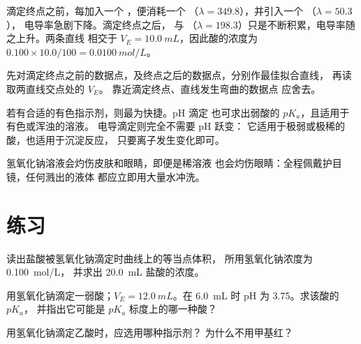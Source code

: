\begin{example}[读取两条直线]\label{ex:g12:ph-conductivity-titrations:lines}
滴定终点之前，每加入一个 ，便消耗一个 
（$\lambda = 349.8$），并引入一个 （$\lambda = 50.3$），
电导率急剧下降。滴定终点之后， 与 
（$\lambda = 198.3$）只是不断积累，电导率随之上升。两条直线
相交于 $V_E = \qty{10.0}{mL}$，因此酸的浓度为
$0.100 \times 10.0 / 100 = \qty{0.0100}{mol/L}$。
\end{example}

\begin{method}[由电导滴定确定滴定终点]\label{met:g12:ph-conductivity-titrations:two-lines}
先对滴定终点之前的数据点，及终点之后的数据点，分别作最佳拟合直线，
再读取两直线交点处的 $V_E$。
靠近滴定终点、直线发生弯曲的数据点
应舍去。
\end{method}

\begin{remark}[何时选用何种方法]\label{rem:g12:ph-conductivity-titrations:which}
若有合适的有色指示剂，则最为快捷。pH 滴定
也可求出弱酸的 $pK_a$，且适用于有色或浑浊的溶液。
电导滴定则完全不需要 pH 跃变：
它适用于极弱或极稀的酸，也适用于沉淀反应，
只要离子发生变化即可。
\end{remark}

\begin{safety}{}
氢氧化钠溶液会灼伤皮肤和眼睛，即便是稀溶液
  也会灼伤眼睛：全程佩戴护目镜，任何溅出的液体
都应立即用大量水冲洗。
\end{safety}

\section{练习}


\begin{exercise}[$\star$]\label{exo:g12:ph-conductivity-titrations:1}
读出盐酸被氢氧化钠滴定时曲线上的等当点体积，
所用氢氧化钠浓度为 \qty{0.100}{mol/L}，
并求出 \qty{20.0}{mL} 盐酸的浓度。
\end{exercise}

\begin{exercise}[$\star$]\label{exo:g12:ph-conductivity-titrations:2}
用氢氧化钠滴定一弱酸；$V_E = \qty{12.0}{mL}$。在
\qty{6.0}{mL} 时 pH 为 3.75。求该酸的 $pK_a$，
并指出它可能是 $pK_a$ 标度上的哪一种酸？
\end{exercise}

\begin{exercise}[$\star$]\label{exo:g12:ph-conductivity-titrations:3}
用氢氧化钠滴定乙酸时，应选用哪种指示剂？
为什么不用甲基红？
\end{exercise}

